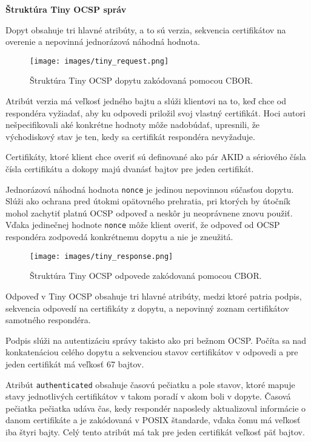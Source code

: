 \documentclass[12pt, twoside]{book}
\newcommand{\subsubsubsection}[1]{%
  \vspace{0.2em}  
  \textbf{#1} \\[0.2em]
  \hspace*{\parindent}
}
\begin{document}
\subsubsubsection{Štruktúra Tiny OCSP správ}
Dopyt obsahuje tri hlavné atribúty, a to sú verzia, sekvencia certifikátov na overenie a nepovinná jednorázová náhodná hodnota. 

\begin{figure}[H]
\centering
\texttt{[image: images/tiny\_request.png]}
\caption{Štruktúra Tiny OCSP dopytu zakódovaná pomocou CBOR.}
\end{figure}

Atribút verzia má veľkosť jedného bajtu a slúži klientovi na to, keď chce od respondéra vyžiadať, aby ku odpovedi priložil svoj vlastný certifikát. Hoci autori nešpecifikovali aké konkrétne hodnoty môže nadobúdať, upresnili, že východiskový stav je ten, kedy sa certifikát respondéra nevyžaduje.

Certifikáty, ktoré klient chce overiť sú definované ako pár AKID a sériového čísla 
čísla certifikátu a dokopy majú dvanásť bajtov pre jeden certifikát.

Jednorázová náhodná hodnota \texttt{nonce} je jedinou nepovinnou súčasťou dopytu.  Slúži ako ochrana pred útokmi opätovného prehratia, pri ktorých by útočník mohol zachytiť platnú OCSP odpoveď a neskôr ju neoprávnene znovu použiť. Vďaka jedinečnej hodnote \texttt{nonce} môže klient overiť, že odpoveď od OCSP respondéra zodpovedá konkrétnemu dopytu a nie je zneužitá.

\begin{figure}[H]
\centering
\texttt{[image: images/tiny\_response.png]}
\caption{Štruktúra Tiny OCSP odpovede zakódovaná pomocou CBOR.}
\end{figure}

Odpoveď v Tiny OCSP obsahuje tri hlavné atribúty, medzi ktoré patria podpis, sekvencia odpovedí na certifikáty z dopytu, a nepovinný zoznam certifikátov samotného respondéra.

Podpis slúži na autentizáciu správy takisto ako pri bežnom OCSP. Počíta sa nad konkatenáciou celého dopytu a sekvenciou stavov certifikátov v odpovedi a pre jeden certifikát má veľkosť 67 bajtov.

Atribút \texttt{authenticated} obsahuje časovú pečiatku a pole stavov, ktoré mapuje stavy jednotlivých certifikátov v takom poradí v akom boli v dopyte.
Časová pečiatka pečiatka udáva čas, kedy respondér naposledy aktualizoval informácie o danom certifikáte a je zakódovaná v POSIX štandarde, vďaka čomu má veľkosť iba štyri bajty. Celý tento atribút má tak pre jeden certifikát veľkosť päť bajtov.
\end{document}
